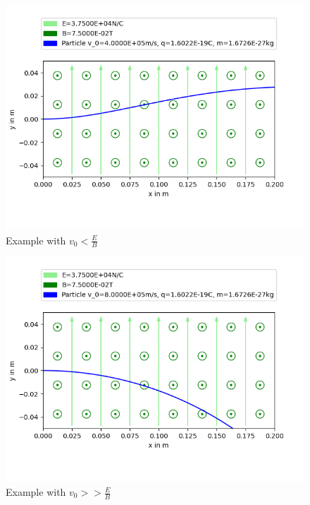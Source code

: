\documentclass[a4paper, 10pt]{article}
\begin{document}
\begin{figure}[ht]
\caption{Example with $v_0<\frac{E}{B}$}
\centering
\includegraphics[width=\textwidth]{figure_2}
\end{figure}
\begin{figure}[ht]
\caption{Example with $v_0>>\frac{E}{B}$}
\centering
\includegraphics[width=\textwidth]{figure_4}
\end{figure}
\end{document}
